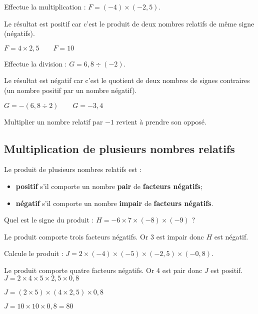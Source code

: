 \begin{exemple*1}
Effectue la multiplication : $F = (-4) \times (-2,5)$.

\correction
Le résultat est positif car c'est le produit de deux nombres relatifs de même signe (négatifs).

$F = 4 \times 2,5 \qquad F = 10$
\end{exemple*1}

\begin{exemple*1}
Effectue la division : $G = 6,8 \div (-2)$.

\correction
Le résultat est négatif car c'est le quotient de deux nombres de signes contraires (un nombre positif par un nombre négatif).

$G = -(6,8 \div 2) \qquad		G = -3,4$
\end{exemple*1}

\begin{remarque}
Multiplier un nombre relatif par $-1$ revient à prendre son opposé.
\end{remarque}


\subsection{Multiplication de plusieurs nombres relatifs}

\begin{aconnaitre}
Le produit de plusieurs nombres relatifs est : 
\begin{itemize}
    \item \textbf{positif} s'il comporte un nombre \textbf{pair} de \textbf{facteurs négatifs};
    \item \textbf{négatif} s'il comporte un nombre \textbf{impair} de \textbf{facteurs négatifs}.
\end{itemize}
\end{aconnaitre}

\begin{exemple*1}
Quel est le signe du produit : $H = -6 \times 7 \times (-8) \times (-9)$ ?

\correction
Le produit comporte trois facteurs négatifs. Or 3 est impair donc $H$ est négatif.
\end{exemple*1}


\begin{exemple*1}
Calcule le produit : $J = 2 \times (-4) \times (-5) \times (-2,5) \times (-0,8)$.

\correction
Le produit comporte quatre facteurs négatifs. Or 4 est pair donc $J$ est positif.
$J = 2 \times 4 \times 5 \times 2,5 \times 0,8$

$J = (2 \times 5) \times (4 \times 2,5) \times 0,8$

$J = 10 \times 10 \times 0,8 = 80 $
\end{exemple*1}


